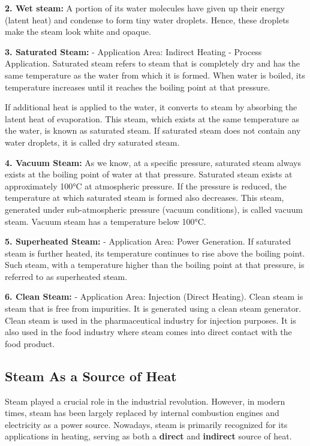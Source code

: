 \textbf{2. Wet steam:} A portion of its water molecules have given up their energy (latent heat) and condense to form tiny water droplets. Hence, these droplets make the steam look white and opaque\cite{steam_types_tlv}.

\textbf{3. Saturated Steam:} - Application Area: Indirect Heating - Process Application.
Saturated steam refers to steam that is completely dry and has the same temperature as the water from which it is formed. When water is boiled, its temperature increases until it reaches the boiling point at that pressure.

If additional heat is applied to the water, it converts to steam by absorbing the latent heat of evaporation. This steam, which exists at the same temperature as the water, is known as saturated steam. If saturated steam does not contain any water droplets, it is called dry saturated steam\cite{steam_types_fm}.

\textbf{4. Vacuum Steam:}
As we know, at a specific pressure, saturated steam always exists at the boiling point of water at that pressure. Saturated steam exists at approximately 100°C at atmospheric pressure. 
If the pressure is reduced, the temperature at which saturated steam is formed also decreases. This steam, generated under sub-atmospheric pressure (vacuum conditions), is called vacuum steam. Vacuum steam has a temperature below 100°C\cite{steam_types_fm}.

\textbf{5. Superheated Steam:} - Application Area: Power Generation. If saturated steam is further heated, its temperature continues to rise above the boiling point. Such steam, with a temperature higher than the boiling point at that pressure, is referred to as superheated steam\cite{steam_types_fm}.

\textbf{6. Clean Steam:} - Application Area: Injection (Direct Heating). Clean steam is steam that is free from impurities. It is generated using a clean steam generator. Clean steam is used in the pharmaceutical industry for injection purposes. It is also used in the food industry where steam comes into direct contact with the food product\cite{steam_types_fm}.

\subsection{Steam As a Source of Heat}
Steam played a crucial role in the industrial revolution. However, in modern times, steam has been largely replaced by internal combustion engines and electricity as a power source. Nowadays, steam is primarily recognized for its applications in heating, serving as both a \textbf{direct} and \textbf{indirect} source of heat.

